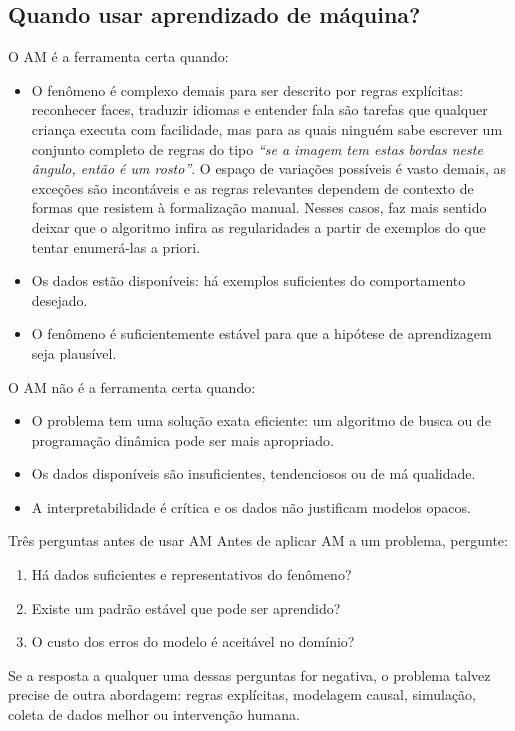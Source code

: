 \documentclass[12pt,a4paper]{article}
\begin{document}
\subsection{Quando usar aprendizado de máquina?}

O AM é a ferramenta certa quando:

\begin{itemize}
    \item O fenômeno é complexo demais para ser descrito por regras explícitas: reconhecer faces, traduzir idiomas e entender fala são tarefas que qualquer criança executa com facilidade, mas para as quais ninguém sabe escrever um conjunto completo de regras do tipo \textit{``se a imagem tem estas bordas neste ângulo, então é um rosto''}. O espaço de variações possíveis é vasto demais, as exceções são incontáveis e as regras relevantes dependem de contexto de formas que resistem à formalização manual. Nesses casos, faz mais sentido deixar que o algoritmo infira as regularidades a partir de exemplos do que tentar enumerá-las a priori.
    \item Os dados estão disponíveis: há exemplos suficientes do comportamento desejado.
    \item O fenômeno é suficientemente estável para que a hipótese de aprendizagem seja plausível.
\end{itemize}

O AM não é a ferramenta certa quando:

\begin{itemize}
    \item O problema tem uma solução exata eficiente: um algoritmo de busca ou de programação dinâmica pode ser mais apropriado.
    \item Os dados disponíveis são insuficientes, tendenciosos ou de má qualidade.
    \item A interpretabilidade é crítica e os dados não justificam modelos opacos.
\end{itemize}

\begin{notabox}{Três perguntas antes de usar AM}
Antes de aplicar AM a um problema, pergunte:

\begin{enumerate}[nosep]
    \item Há dados suficientes e representativos do fenômeno?
    \item Existe um padrão estável que pode ser aprendido?
    \item O custo dos erros do modelo é aceitável no domínio?
\end{enumerate}

Se a resposta a qualquer uma dessas perguntas for negativa, o problema talvez precise de outra abordagem: regras explícitas, modelagem causal, simulação, coleta de dados melhor ou intervenção humana.
\end{notabox}
\end{document}

